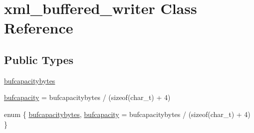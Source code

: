 \hypertarget{classxml__buffered__writer}{
\section{xml\_\-buffered\_\-writer Class Reference}
\label{classxml__buffered__writer}
}
\subsection*{Public Types}
\begin{CompactItemize}
\item 
\hyperlink{classxml__buffered__writer_e80799461cc7c7c621ff75eb6835e7ce9021e7b22ef17fba93b80380f0ffbbc8}{bufcapacitybytes}
\item 
\hyperlink{classxml__buffered__writer_e80799461cc7c7c621ff75eb6835e7ceb8b49b73105796783607f1f1ddd382cd}{bufcapacity} = bufcapacitybytes / (sizeof(char\_\-t) + 4)
\item 
enum \{ \hyperlink{classxml__buffered__writer_e80799461cc7c7c621ff75eb6835e7ce9021e7b22ef17fba93b80380f0ffbbc8}{bufcapacitybytes}, 
\hyperlink{classxml__buffered__writer_e80799461cc7c7c621ff75eb6835e7ceb8b49b73105796783607f1f1ddd382cd}{bufcapacity} =  bufcapacitybytes / (sizeof(char\_\-t) + 4)
 \}
\end{CompactItemize}
